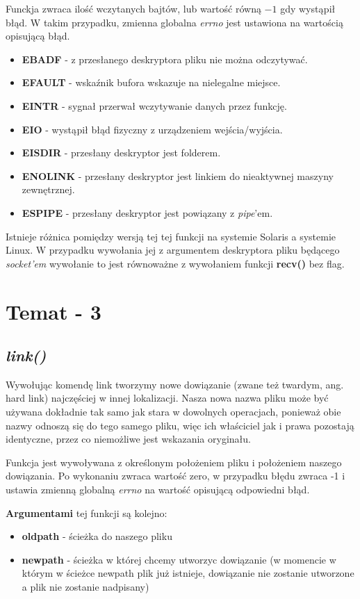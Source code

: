 \documentclass{article}
\begin{document}
Funckja zwraca ilość wczytanych bajtów, lub wartość równą $-1$ gdy wystąpił błąd.
W takim przypadku, zmienna globalna \textit{errno} jest ustawiona na wartością opisującą błąd.

\begin{itemize}
\item \textbf{EBADF} - z przesłanego deskryptora pliku nie można odczytywać.
\item \textbf{EFAULT} - wskaźnik bufora wskazuje na nielegalne miejsce.
\item \textbf{EINTR} - sygnał przerwał wczytywanie danych przez funkcję.
\item \textbf{EIO} - wystąpił błąd fizyczny z urządzeniem wejścia/wyjścia.
\item \textbf{EISDIR} - przesłany deskryptor jest folderem.
\item \textbf{ENOLINK} - przesłany deskryptor jest linkiem do nieaktywnej maszyny zewnętrznej.
\item \textbf{ESPIPE} - przesłany deskryptor jest powiązany z \textit{pipe}'em.
\end{itemize}

Istnieje różnica pomiędzy wersją tej tej funkcji na systemie Solaris a systemie Linux.
W przypadku wywołania jej z argumentem deskryptora pliku będącego \textit{socket'em} wywołanie to jest równoważne z wywołaniem funkcji \textbf{recv()} bez flag.

  
\section{Temat - 3}
\subsection{\textit{link()}}
Wywołując komendę link tworzymy nowe dowiązanie (zwane też twardym, ang. hard link) najczęściej w innej lokalizacji. Nasza nowa nazwa pliku może być używana dokładnie tak samo jak stara w dowolnych operacjach, ponieważ obie nazwy odnoszą się do tego samego pliku, więc ich właściciel jak i prawa pozostają identyczne, przez co niemożliwe jest wskazania oryginału.

Funkcja jest wywoływana z określonym położeniem pliku i położeniem naszego dowiązania. Po wykonaniu zwraca wartość zero, w przypadku błędu zwraca -1 i ustawia zmienną globalną \textit{errno} na wartość opisującą odpowiedni błąd.


\textbf{Argumentami} tej funkcji są kolejno:
\begin{itemize}
\item \textbf{oldpath} - ścieżka do naszego pliku
\item \textbf{newpath} - ścieżka w której chcemy utworzyc dowiązanie (w momencie w którym w ścieżce newpath plik już istnieje, dowiązanie nie zostanie utworzone a plik nie zostanie nadpisany)
\end{itemize}
\end{document}
